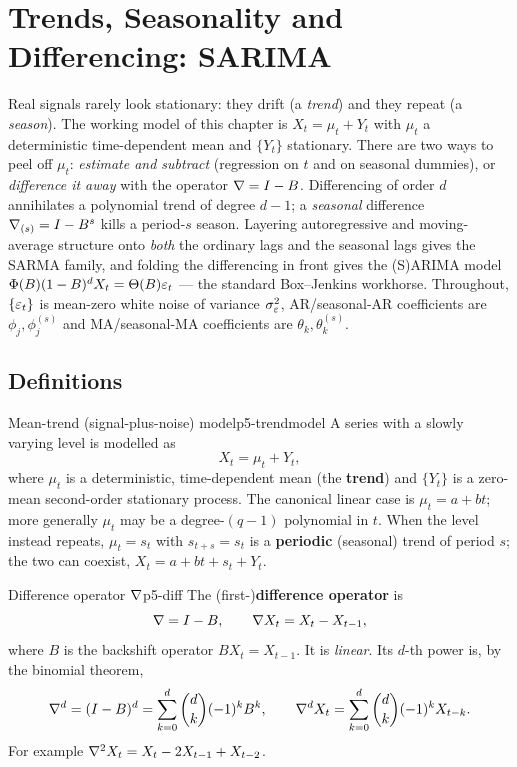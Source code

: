 \section{Trends, Seasonality and Differencing: SARIMA}
\label{sec:sarima}

Real signals rarely look stationary: they drift (a \emph{trend}) and they
repeat (a \emph{season}). The working model of this chapter is
$X_t=\mu_t+Y_t$ with $\mu_t$ a deterministic time-dependent mean and $\{Y_t\}$
stationary. There are two ways to peel off $\mu_t$: \emph{estimate and subtract}
(regression on $t$ and on seasonal dummies), or \emph{difference it away} with
the operator $\nabla=I-B$. Differencing of order $d$ annihilates a polynomial
trend of degree $d-1$; a \emph{seasonal} difference $\nabla_{(s)}=I-B^{s}$ kills
a period-$s$ season. Layering autoregressive and moving-average structure onto
\emph{both} the ordinary lags and the seasonal lags gives the SARMA family, and
folding the differencing in front gives the (S)ARIMA model
$\Phi(B)(1-B)^{d}X_t=\Theta(B)\varepsilon_t$ --- the standard Box--Jenkins workhorse.
Throughout, $\{\varepsilon_t\}$ is mean-zero white noise of variance $\sigma_\varepsilon^2$,
AR/seasonal-AR coefficients are $\phi_j,\phi^{(s)}_j$ and MA/seasonal-MA
coefficients are $\theta_k,\theta^{(s)}_k$.

\subsection{Definitions}

\begin{definition}{Mean-trend (signal-plus-noise) model}{p5-trendmodel}
A series with a slowly varying level is modelled as
\[
X_t=\mu_t+Y_t,
\]
where $\mu_t$ is a deterministic, time-dependent mean (the \textbf{trend}) and
$\{Y_t\}$ is a zero-mean second-order stationary process. The canonical linear
case is $\mu_t=a+bt$; more generally $\mu_t$ may be a degree-$(q-1)$ polynomial
in $t$. When the level instead repeats, $\mu_t=s_t$ with $s_{t+s}=s_t$ is a
\textbf{periodic} (seasonal) trend of period $s$; the two can coexist,
$X_t=a+bt+s_t+Y_t$.
\end{definition}

\begin{definition}{Difference operator $\nabla$}{p5-diff}
The (first-)\textbf{difference operator} is
\[
\nabla=I-B,\qquad \nabla X_t=X_t-X_{t-1},
\]
where $B$ is the backshift operator $BX_t=X_{t-1}$. It is \emph{linear}. Its
$d$-th power is, by the binomial theorem,
\[
\nabla^{d}=(I-B)^{d}=\sum_{k=0}^{d}\binom{d}{k}(-1)^{k}B^{k},
\qquad
\nabla^{d}X_t=\sum_{k=0}^{d}\binom{d}{k}(-1)^{k}X_{t-k}.
\]
For example $\nabla^{2}X_t=X_t-2X_{t-1}+X_{t-2}$.
\end{definition}

